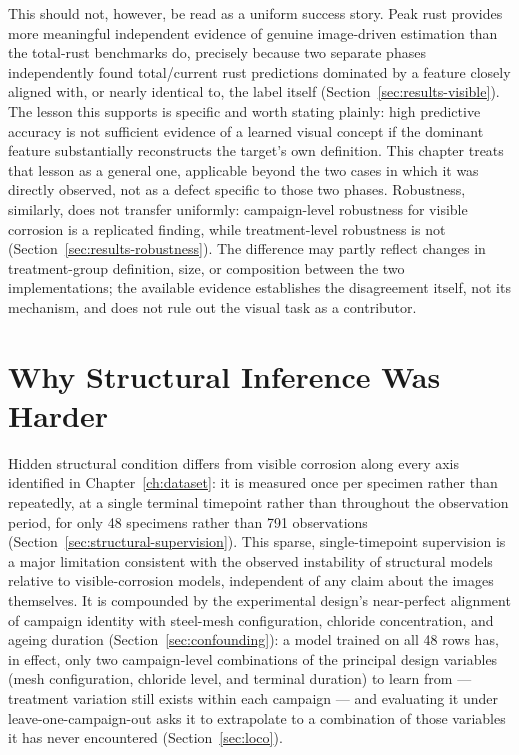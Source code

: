 This should not, however, be read as a uniform success story. Peak rust
provides more meaningful independent evidence of genuine image-driven
estimation than the total-rust benchmarks do, precisely because two
separate phases independently found total/current rust predictions
dominated by a feature closely aligned with, or nearly identical to, the
label itself (Section~\ref{sec:results-visible}). The lesson this
supports is specific and worth stating plainly: high predictive accuracy
is not sufficient evidence of a learned visual concept if the dominant
feature substantially reconstructs the target's own definition. This
chapter treats that lesson as a general one, applicable beyond the two
cases in which it was directly observed, not as a defect specific to
those two phases. Robustness, similarly, does not transfer uniformly:
campaign-level robustness for visible corrosion is a replicated finding,
while treatment-level robustness is not
(Section~\ref{sec:results-robustness}). The difference may partly reflect
changes in treatment-group definition, size, or composition between the
two implementations; the available evidence establishes the disagreement
itself, not its mechanism, and does not rule out the visual task as a
contributor.

\section{Why Structural Inference Was Harder}
\label{sec:interp-structural}

Hidden structural condition differs from visible corrosion along every
axis identified in Chapter~\ref{ch:dataset}: it is measured once per
specimen rather than repeatedly, at a single terminal timepoint rather
than throughout the observation period, for only 48 specimens rather than
791 observations (Section~\ref{sec:structural-supervision}). This sparse,
single-timepoint supervision is a major limitation consistent with the
observed instability of structural models relative to visible-corrosion
models, independent of any claim about the images themselves. It is
compounded by the experimental design's near-perfect alignment of
campaign identity with steel-mesh configuration, chloride concentration,
and ageing duration (Section~\ref{sec:confounding}): a model trained on
all 48 rows has, in effect, only two campaign-level combinations of the
principal design variables (mesh configuration, chloride level, and
terminal duration) to learn from — treatment variation still exists within
each campaign — and evaluating it under leave-one-campaign-out asks it to
extrapolate to a combination of those variables it has never encountered
(Section~\ref{sec:loco}).

